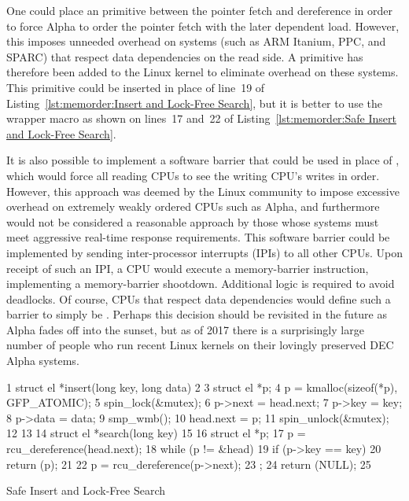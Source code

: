 One could place an  primitive
between the pointer fetch and dereference in order to force Alpha
to order the pointer fetch with the later dependent load.
However, this imposes unneeded overhead on systems (such as ARM
Itanium, PPC, and SPARC) that respect data dependencies on the read side.
A  primitive has therefore been added to the
Linux kernel to eliminate overhead on these systems.
This primitive could be inserted in place of line~19 of
Listing~\ref{lst:memorder:Insert and Lock-Free Search},
but it is better to use the  wrapper macro
as shown on lines~17 and~22 of
Listing~\ref{lst:memorder:Safe Insert and Lock-Free Search}.

It is also possible to implement a software barrier
that could be used in place of , which would force
all reading CPUs to see the writing CPU's writes in order.
However, this approach was deemed by the Linux community
to impose excessive overhead
on extremely weakly ordered CPUs such as Alpha, and furthermore would
not be considered a reasonable approach by those whose systems must meet
aggressive real-time response requirements.
This software barrier could be implemented by sending inter-processor
interrupts (IPIs) to all other CPUs.
Upon receipt of such an IPI, a CPU would execute a memory-barrier
instruction, implementing a memory-barrier shootdown.
Additional logic is required to avoid deadlocks.
Of course, CPUs that respect data dependencies would define such a barrier
to simply be .
Perhaps this decision should be revisited in the future as Alpha
fades off into the sunset, but as of 2017 there is a surprisingly
large number of people who run recent Linux kernels on their lovingly
preserved DEC Alpha systems.

\begin{listing}[tbp]
{ \scriptsize
\begin{verbbox}
 1  struct el *insert(long key, long data)
 2  {
 3      struct el *p;
 4      p = kmalloc(sizeof(*p), GFP_ATOMIC);
 5      spin_lock(&mutex);
 6      p->next = head.next;
 7      p->key = key;
 8      p->data = data;
 9      smp_wmb();
10      head.next = p;
11      spin_unlock(&mutex);
12  }
13
14  struct el *search(long key)
15  {
16      struct el *p;
17      p = rcu_dereference(head.next);
18      while (p != &head) {
19          if (p->key == key) {
20              return (p);
21          }
22          p = rcu_dereference(p->next);
23      };
24      return (NULL);
25  }
\end{verbbox}
}
\centering
\theverbbox
\caption{Safe Insert and Lock-Free Search}
\label{lst:memorder:Safe Insert and Lock-Free Search}
\end{listing}


